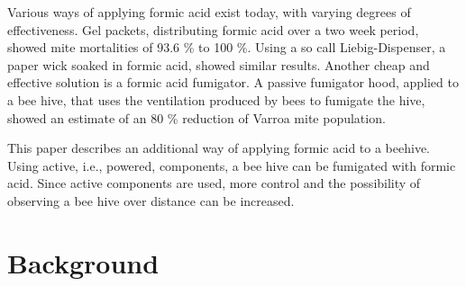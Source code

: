 \documentclass[11pt]{article}
\begin{document}
    Various ways of applying formic acid exist today, with varying degrees of effectiveness.
    Gel packets, distributing formic acid over a two week period, showed mite mortalities of 93.6 \% to 100 \%\cite{FormicAcidBasedTreatments}.
    Using a so call Liebig-Dispenser, a paper wick soaked in formic acid, showed similar results\cite{FormicAcidBasedTreatments}.
    Another cheap and effective solution is a formic acid fumigator\cite{FormicAcidFumigator}.
    A passive fumigator hood, applied to a bee hive, that uses the ventilation produced by bees to fumigate the hive, showed an estimate of an 80 \% reduction of Varroa mite population.

    This paper describes an additional way of applying formic acid to a beehive.
    Using active, i.e., powered, components, a bee hive can be fumigated with formic acid.
    Since active components are used, more control and the possibility of observing a bee hive over distance can be increased.

    \section{Background}\label{sec:background}

    \newpage
    \printbibliography
\end{document}
